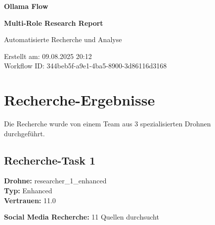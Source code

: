 \documentclass[12pt,a4paper]{article}
\begin{document}
\begin{titlepage}
    \centering
    
    \vspace*{2cm}
    
    {\Huge\bfseries Ollama Flow}
    
    {\Huge\bfseries Multi-Role Research Report}
    
    \vspace{2cm}
    
    {\Large Automatisierte Recherche und Analyse}
    
    \vspace{3cm}
    
    
    \vspace{2cm}
    
    
    \vfill
    
    {\large
    Erstellt am: 09.08.2025 20:12\\
    Workflow ID: 344beb5f-a9e1-4ba5-8900-3d86116d3168
    }
    
\end{titlepage}

\newpage
\tableofcontents
\newpage

\section{Recherche-Ergebnisse}

Die Recherche wurde von einem Team aus 3 spezialisierten Drohnen durchgeführt.

\subsection{Recherche-Task 1}

\textbf{Drohne:} researcher\_1\_enhanced\\
\textbf{Typ:} Enhanced\\
\textbf{Vertrauen:} 11.0%

\textbf{Social Media Recherche:} 11 Quellen durchsucht
\end{document}
